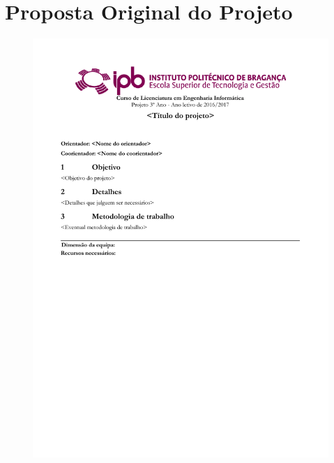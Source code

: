 \chapter{Proposta Original do Projeto}
\label{apendice1}

\begin{figure}
\hspace{-12ex}
\includegraphics{etc/PropostaProjeto.pdf}
\end{figure}